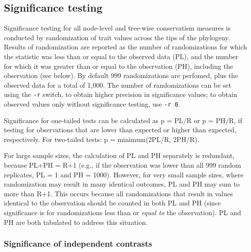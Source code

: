 \documentclass[12pt,letterpaper]{article}
\begin{document}
\subsection{Significance testing}

Significance testing for all node-level and tree-wise conservatism
measures is conducted by randomization of trait values across the tips
of the phylogeny. Results of randomization are reported as the number
of randomizations for which the statistic was less than or equal to
the observed data (PL), and the number for which it was greater than
or equal to the observation (PH), including the observation (see
below). By default 999 randomizations are perfomed, plus the observed
data for a total of 1,000. The number of randomizations can be set
using the \verb|-r| switch, to obtain higher precision in significance
values; to obtain observed values only without significance testing,
use \verb|-r 0|.

Significance for one-tailed tests can be calculated as p = PL/R or p =
PH/R, if testing for observations that are lower than expected or
higher than expected, respectively. For two-tailed tests: p =
minimum(2PL/R, 2PH/R).

For large sample sizes, the calculation of PL and PH separately is
redundant, because PL+PH = R+1 (e.g., if the observation was lower
than all 999 random replicates, PL = 1 and PH = 1000). However, for
very small sample sizes, where randomization may result in many
identical outcomes, PL and PH may sum to more than R+1. This occurs
because all randomizations that result in values identical to the
observation should be counted in both PL and PH (since significance is
for randomizations less than or \textit{equal to} the observation). PL
and PH are both tabulated to address this situation.

\subsubsection{Significance of independent contrasts}
\end{document}
